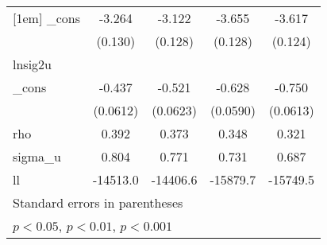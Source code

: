 {\begin{tabular}{l*{4}{c}}
[1em]
\_cons      &      -3.264\sym{***}&      -3.122\sym{***}&      -3.655\sym{***}&      -3.617\sym{***}\\
            &     (0.130)         &     (0.128)         &     (0.128)         &     (0.124)         \\
\hline
lnsig2u     &                     &                     &                     &                     \\
\_cons      &      -0.437\sym{***}&      -0.521\sym{***}&      -0.628\sym{***}&      -0.750\sym{***}\\
            &    (0.0612)         &    (0.0623)         &    (0.0590)         &    (0.0613)         \\
\hline
rho         &       0.392         &       0.373         &       0.348         &       0.321         \\
sigma\_u     &       0.804         &       0.771         &       0.731         &       0.687         \\
ll          &    -14513.0         &    -14406.6         &    -15879.7         &    -15749.5         \\
\hline\hline
\multicolumn{5}{l}{\footnotesize Standard errors in parentheses}\\
\multicolumn{5}{l}{\footnotesize \sym{*} \(p<0.05\), \sym{**} \(p<0.01\), \sym{***} \(p<0.001\)}\\
\end{tabular}
}
